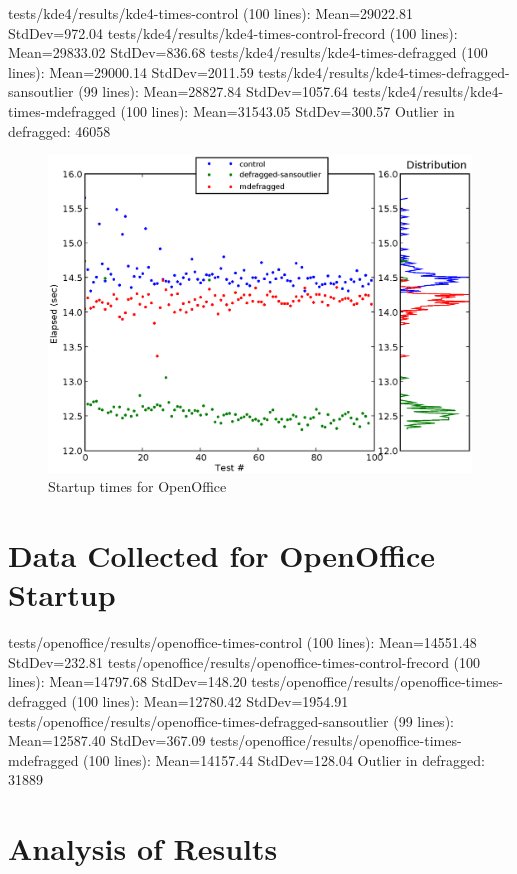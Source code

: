 \documentclass[10pt,twocolumn,letterpaper]{article}
\begin{document}
tests/kde4/results/kde4-times-control (100 lines):  Mean=29022.81  StdDev=972.04
tests/kde4/results/kde4-times-control-frecord (100 lines):  Mean=29833.02  StdDev=836.68
tests/kde4/results/kde4-times-defragged (100 lines):  Mean=29000.14  StdDev=2011.59
tests/kde4/results/kde4-times-defragged-sansoutlier (99 lines):  Mean=28827.84  StdDev=1057.64
tests/kde4/results/kde4-times-mdefragged (100 lines):  Mean=31543.05  StdDev=300.57
Outlier in defragged: 46058

\begin{figure}[!htb]
\includegraphics[scale=0.75]{openoffice-chart.eps}
\caption{Startup times for OpenOffice}
\label{oochart}
\end{figure}

\section{Data Collected for OpenOffice Startup}

tests/openoffice/results/openoffice-times-control (100 lines):  Mean=14551.48  StdDev=232.81
tests/openoffice/results/openoffice-times-control-frecord (100 lines):  Mean=14797.68  StdDev=148.20
tests/openoffice/results/openoffice-times-defragged (100 lines):  Mean=12780.42  StdDev=1954.91
tests/openoffice/results/openoffice-times-defragged-sansoutlier (99 lines):  Mean=12587.40  StdDev=367.09
tests/openoffice/results/openoffice-times-mdefragged (100 lines):  Mean=14157.44  StdDev=128.04
Outlier in defragged: 31889

\section{Analysis of Results}
\end{document}
